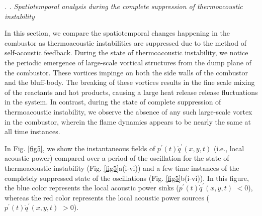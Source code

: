 \documentclass[twocolumn,10pt]{article} %
\renewcommand{\subsection}%
              [1]%
              {%
               \bgroup%
               \flushleft%
               \small\em%
               \stepcounter{subsection}%
               \arabic{section}.%
               \arabic{subsection}. #1%
               \par%
               \egroup%
              }%
\begin{document}
\subsection{Spatiotemporal analysis during the complete suppression of thermoacoustic instability} \addvspace{10pt}


In this section, we compare the spatiotemporal changes happening in the combustor as thermoacoustic instabilities are suppressed due to the method of self-acoustic feedback. During the state of thermoacoustic instability, we notice the periodic emergence of large-scale vortical structures from the dump plane of the combustor. These vortices impinge on both the side walls of the combustor and the bluff-body. The breaking of these vortices results in the fine scale mixing of the reactants and hot products, causing a large heat release release fluctuations in the system. In contrast, during the state of complete suppression of thermoacoustic instability, we observe the absence of any such large-scale vortex in the combustor, wherein the flame dynamics appears to be nearly the same at all time instances. 

In Fig. \ref{fig5}, we show the instantaneous fields of $p^\prime(t) \dot{q}^\prime(x,y,t)$ (i.e., local acoustic power) compared over a period of the oscillation for the state of thermoacoustic instability (Fig. \ref{fig5}a(i-vi)) and a few time instances of the completely suppressed state of the oscillations (Fig. \ref{fig5}b(i-vi)). %
In this figure, the blue color represents the local acoustic power sinks ($p^\prime(t) \dot{q}^\prime(x,y,t)$ $<0$), whereas the red color represents the local acoustic power sources ($p^\prime(t) \dot{q}^\prime(x,y,t)$ $>0$). 
\end{document}
